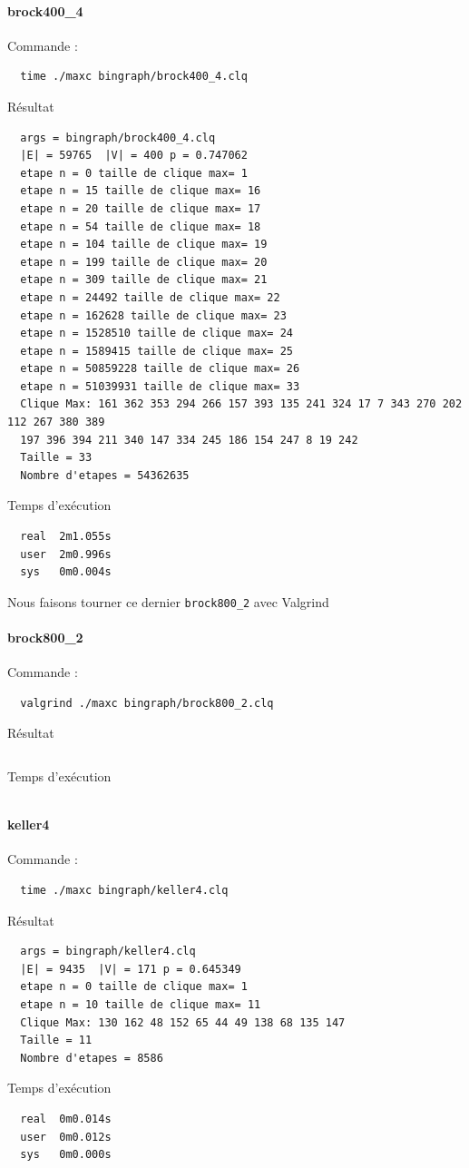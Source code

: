 \documentclass{article}
\begin{document}
\paragraph{brock400\_4}
Commande :
\begin{verbatim}
  time ./maxc bingraph/brock400_4.clq
\end{verbatim}
Résultat
\begin{verbatim}
  args = bingraph/brock400_4.clq
  |E| = 59765  |V| = 400 p = 0.747062
  etape n = 0 taille de clique max= 1
  etape n = 15 taille de clique max= 16
  etape n = 20 taille de clique max= 17
  etape n = 54 taille de clique max= 18
  etape n = 104 taille de clique max= 19
  etape n = 199 taille de clique max= 20
  etape n = 309 taille de clique max= 21
  etape n = 24492 taille de clique max= 22
  etape n = 162628 taille de clique max= 23
  etape n = 1528510 taille de clique max= 24
  etape n = 1589415 taille de clique max= 25
  etape n = 50859228 taille de clique max= 26
  etape n = 51039931 taille de clique max= 33
  Clique Max: 161 362 353 294 266 157 393 135 241 324 17 7 343 270 202 112 267 380 389
  197 396 394 211 340 147 334 245 186 154 247 8 19 242
  Taille = 33
  Nombre d'etapes = 54362635
\end{verbatim}
Temps d'exécution
\begin{verbatim}
  real  2m1.055s
  user  2m0.996s
  sys   0m0.004s
\end{verbatim}
Nous faisons tourner ce dernier \texttt{brock800\_2} avec Valgrind
\paragraph{brock800\_2}
Commande :
\begin{verbatim}
  valgrind ./maxc bingraph/brock800_2.clq
\end{verbatim}
Résultat
\begin{verbatim}

\end{verbatim}
Temps d'exécution
\begin{verbatim}

\end{verbatim}
\paragraph{keller4}
Commande :
\begin{verbatim}
  time ./maxc bingraph/keller4.clq
\end{verbatim}
Résultat
\begin{verbatim}
  args = bingraph/keller4.clq
  |E| = 9435  |V| = 171 p = 0.645349
  etape n = 0 taille de clique max= 1
  etape n = 10 taille de clique max= 11
  Clique Max: 130 162 48 152 65 44 49 138 68 135 147
  Taille = 11
  Nombre d'etapes = 8586
\end{verbatim}
Temps d'exécution
\begin{verbatim}
  real  0m0.014s
  user  0m0.012s
  sys   0m0.000s
\end{verbatim}
\end{document}
